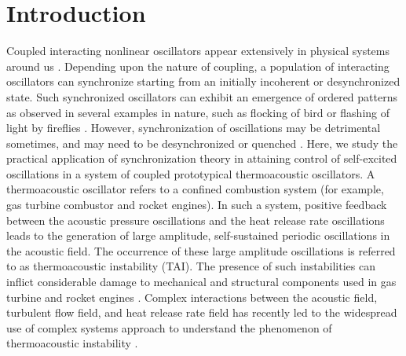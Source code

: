 \documentclass[%
preprint,
 amsmath,amssymb,
 aps,
 pra,
]{revtex4-2}
\begin{document}
\section{\label{Introduction} Introduction}
Coupled interacting nonlinear oscillators appear extensively in physical systems around us \cite{jenkins2013self}. Depending upon the nature of coupling, a population of interacting oscillators can synchronize starting from an initially incoherent or desynchronized state. Such synchronized oscillators can exhibit an emergence of ordered patterns as observed in several examples in nature, such as flocking of bird or flashing of light by fireflies \cite{strogatz2004sync}. However, synchronization of oscillations may be detrimental sometimes, and may need to be desynchronized \cite{strogatz2005crowd} or quenched \cite{biwa2015amplitude}. Here, we study the practical application of synchronization theory in attaining control of self-excited oscillations in a system of coupled prototypical thermoacoustic oscillators. A thermoacoustic oscillator refers to a confined combustion system (for example, gas turbine combustor and rocket engines). In such a system, positive feedback between the acoustic pressure oscillations and the heat release rate oscillations leads to the generation of large amplitude, self-sustained periodic oscillations in the acoustic field. The occurrence of these large amplitude oscillations is referred to as thermoacoustic instability (TAI). The presence of such instabilities can inflict considerable damage to mechanical and structural components used in gas turbine and rocket engines \cite{lieuwen2005combustion, sujith2020complex, pikovsky2003synchronization}. Complex interactions between the acoustic field, turbulent flow field, and heat release rate field has recently led to the widespread use of complex systems approach to understand the phenomenon of thermoacoustic instability \cite{sujith2020complex, juniper2018sensitivity}.
\end{document}
